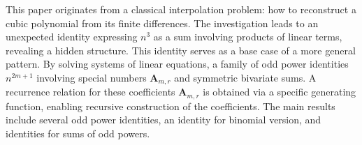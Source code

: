 This paper originates from a classical interpolation problem: how to reconstruct a cubic polynomial
from its finite differences.
The investigation leads to an unexpected identity expressing $n^3$ as a sum involving products of linear terms,
revealing a hidden structure.
This identity serves as a base case of a more general pattern.
By solving systems of linear equations, a family of odd power identities $n^{2m+1}$
involving special numbers $\mathbf{A}_{m,r}$ and symmetric bivariate sums.
A recurrence relation for these coefficients $\mathbf{A}_{m,r}$
is obtained via a specific generating function, enabling recursive construction of the coefficients.
The main results include several odd power identities, an identity for binomial version,
and identities for sums of odd powers.
